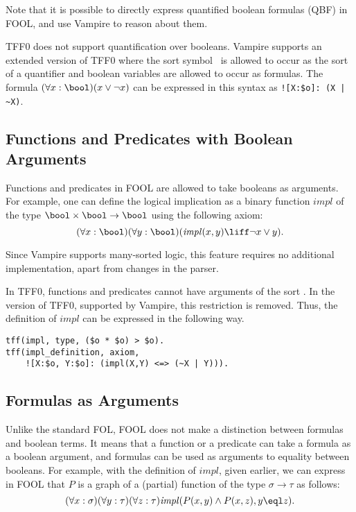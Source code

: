 Note that it is possible to directly express quantified boolean formulas (QBF) in FOOL, and use Vampire to reason about them.

TFF0 does not support quantification over booleans. Vampire supports an extended version of TFF0 where the sort symbol \tptpo\ is allowed to occur as the sort of a quantifier and boolean variables are allowed to occur as formulas. The formula $(\forall x:\bool)(x \lor \neg x)$ can be expressed in this syntax as \lstinline'![X:$o]: (X | ~X)'. 

\subsection{Functions and Predicates with Boolean Arguments}

Functions and predicates in FOOL are allowed to take booleans as arguments. For example, one can define the logical implication as a binary function $\mathit{impl}$ of the type $\bool \times \bool \to \bool$ using the following axiom:
\[
  (\forall x: \bool)(\forall y: \bool)(\mathit{impl}(x, y) \liff \neg x \lor y).
\]

Since Vampire supports many-sorted logic, this feature requires no additional implementation, apart from changes in the parser.

In TFF0, functions and predicates cannot have arguments of the sort \tptpo. In the version of TFF0, supported by Vampire, this restriction is removed. Thus, the definition of $\mathit{impl}$ can be expressed in the following way.
\begin{lstlisting}
tff(impl, type, ($o * $o) > $o).
tff(impl_definition, axiom,
    ![X:$o, Y:$o]: (impl(X,Y) <=> (~X | Y))).
\end{lstlisting}

\subsection{Formulas as Arguments}

Unlike the standard FOL, FOOL does not make a distinction between formulas and boolean terms. It means that a function or a predicate can take a formula as a boolean argument, and formulas can be used as arguments to equality between booleans. For example, with the definition of $\mathit{impl}$, given earlier, we can express in FOOL that
$P$ is a graph of a (partial) function of the type $\sigma \to \tau$ as follows:
\begin{equation}\label{eq:bool-arg-example}
  (\forall x:\sigma)(\forall y:\tau)(\forall z:\tau)\mathit{impl}(P(x,y) \land P(x,z), y \eql z).
\end{equation}

